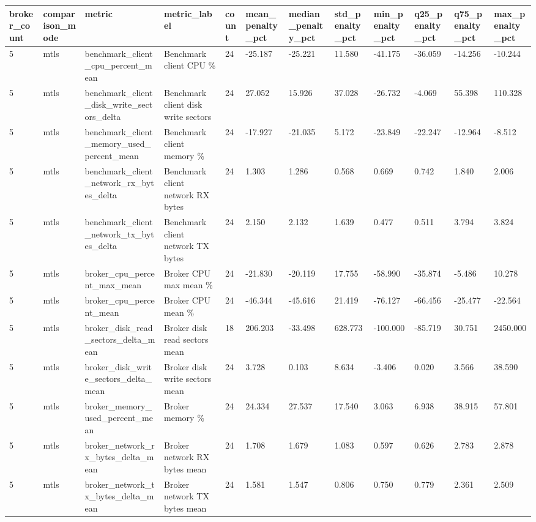 \begin{tabular}{llllllllllll}
\hline
broker\_count & comparison\_mode & metric & metric\_label & count & mean\_penalty\_pct & median\_penalty\_pct & std\_penalty\_pct & min\_penalty\_pct & q25\_penalty\_pct & q75\_penalty\_pct & max\_penalty\_pct \\
\hline
5 & mtls & benchmark\_client\_cpu\_percent\_mean & Benchmark client CPU \% & 24 & -25.187 & -25.221 & 11.580 & -41.175 & -36.059 & -14.256 & -10.244 \\
5 & mtls & benchmark\_client\_disk\_write\_sectors\_delta & Benchmark client disk write sectors & 24 & 27.052 & 15.926 & 37.028 & -26.732 & -4.069 & 55.398 & 110.328 \\
5 & mtls & benchmark\_client\_memory\_used\_percent\_mean & Benchmark client memory \% & 24 & -17.927 & -21.035 & 5.172 & -23.849 & -22.247 & -12.964 & -8.512 \\
5 & mtls & benchmark\_client\_network\_rx\_bytes\_delta & Benchmark client network RX bytes & 24 & 1.303 & 1.286 & 0.568 & 0.669 & 0.742 & 1.840 & 2.006 \\
5 & mtls & benchmark\_client\_network\_tx\_bytes\_delta & Benchmark client network TX bytes & 24 & 2.150 & 2.132 & 1.639 & 0.477 & 0.511 & 3.794 & 3.824 \\
5 & mtls & broker\_cpu\_percent\_max\_mean & Broker CPU max mean \% & 24 & -21.830 & -20.119 & 17.755 & -58.990 & -35.874 & -5.486 & 10.278 \\
5 & mtls & broker\_cpu\_percent\_mean & Broker CPU mean \% & 24 & -46.344 & -45.616 & 21.419 & -76.127 & -66.456 & -25.477 & -22.564 \\
5 & mtls & broker\_disk\_read\_sectors\_delta\_mean & Broker disk read sectors mean & 18 & 206.203 & -33.498 & 628.773 & -100.000 & -85.719 & 30.751 & 2450.000 \\
5 & mtls & broker\_disk\_write\_sectors\_delta\_mean & Broker disk write sectors mean & 24 & 3.728 & 0.103 & 8.634 & -3.406 & 0.020 & 3.566 & 38.590 \\
5 & mtls & broker\_memory\_used\_percent\_mean & Broker memory \% & 24 & 24.334 & 27.537 & 17.540 & 3.063 & 6.938 & 38.915 & 57.801 \\
5 & mtls & broker\_network\_rx\_bytes\_delta\_mean & Broker network RX bytes mean & 24 & 1.708 & 1.679 & 1.083 & 0.597 & 0.626 & 2.783 & 2.878 \\
5 & mtls & broker\_network\_tx\_bytes\_delta\_mean & Broker network TX bytes mean & 24 & 1.581 & 1.547 & 0.806 & 0.750 & 0.779 & 2.361 & 2.509 \\

\end{tabular}
